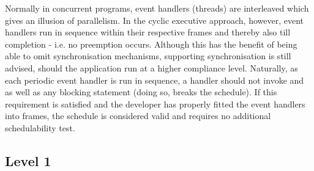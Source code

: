 
Normally in concurrent programs, event handlers (threads) are interleaved which gives an illusion of parallelism. In the cyclic executive approach, however, event handlers run in sequence within their respective frames and thereby also till completion - i.e. no preemption occurs. Although this has the benefit of being able to omit synchronisation mechanisms, supporting synchronisation is still advised, should the application run at a higher compliance level. Naturally, as each periodic event handler is run in sequence, a handler should not invoke  and  as well as any blocking statement (doing so, breaks the schedule). If this requirement is satisfied and the developer has properly fitted the event handlers into frames, the schedule is considered valid and requires no additional schedulability test.

\subsection{Level 1}
